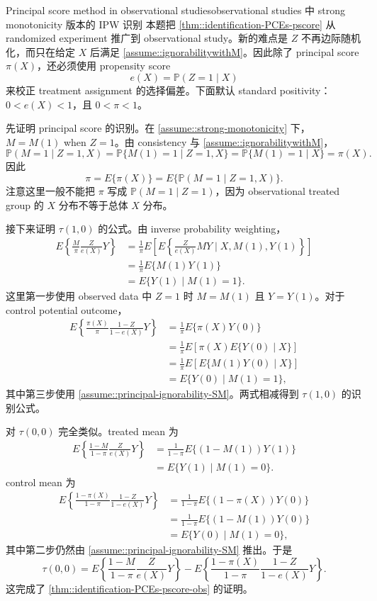 \begin{exercisesolution}{Principal score method in observational studies}{observational studies 中 strong monotonicity 版本的 IPW 识别}
本题把 \cref{thm::identification-PCEs-pscore} 从 randomized experiment 推广到 observational study。新的难点是 $Z$ 不再边际随机化，而只在给定 $X$ 后满足 \cref{assume::ignorabilitywithM}。因此除了 principal score $\pi(X)$，还必须使用 propensity score
\[
e(X)=\mathbb{P}(Z=1\mid X)
\]
来校正 treatment assignment 的选择偏差。下面默认 standard positivity：$0<e(X)<1$，且 $0<\pi<1$。

先证明 principal score 的识别。在 \cref{assume::strong-monotonicity} 下，$M=M(1)$ when $Z=1$。由 consistency 与 \cref{assume::ignorabilitywithM}，
\[
\mathbb{P}(M=1\mid Z=1,X)
=\mathbb{P}\{M(1)=1\mid Z=1,X\}
=\mathbb{P}\{M(1)=1\mid X\}
=\pi(X).
\]
因此
\[
\pi=E\{\pi(X)\}=E\{\mathbb{P}(M=1\mid Z=1,X)\}.
\]
注意这里一般不能把 $\pi$ 写成 $\mathbb{P}(M=1\mid Z=1)$，因为 observational treated group 的 $X$ 分布不等于总体 $X$ 分布。

接下来证明 $\tau(1,0)$ 的公式。由 inverse probability weighting，
\begin{align*}
E\left\{\frac{M}{\pi}\frac{Z}{e(X)}Y\right\}
&=
\frac{1}{\pi}
E\left[E\left\{\frac{Z}{e(X)}M Y\mid X,M(1),Y(1)\right\}\right]\\
&=
\frac{1}{\pi}E\{M(1)Y(1)\}\\
&=
E\{Y(1)\mid M(1)=1\}.
\end{align*}
这里第一步使用 observed data 中 $Z=1$ 时 $M=M(1)$ 且 $Y=Y(1)$。对于 control potential outcome，
\begin{align*}
E\left\{\frac{\pi(X)}{\pi}\frac{1-Z}{1-e(X)}Y\right\}
&=
\frac{1}{\pi}E\{\pi(X)Y(0)\}\\
&=
\frac{1}{\pi}E\left[\pi(X)E\{Y(0)\mid X\}\right]\\
&=
\frac{1}{\pi}E\left[E\{M(1)Y(0)\mid X\}\right]\\
&=
E\{Y(0)\mid M(1)=1\},
\end{align*}
其中第三步使用 \cref{assume::principal-ignorability-SM}。两式相减得到 $\tau(1,0)$ 的识别公式。

对 $\tau(0,0)$ 完全类似。treated mean 为
\begin{align*}
E\left\{\frac{1-M}{1-\pi}\frac{Z}{e(X)}Y\right\}
&=
\frac{1}{1-\pi}E\{(1-M(1))Y(1)\}\\
&=
E\{Y(1)\mid M(1)=0\}.
\end{align*}
control mean 为
\begin{align*}
E\left\{\frac{1-\pi(X)}{1-\pi}\frac{1-Z}{1-e(X)}Y\right\}
&=
\frac{1}{1-\pi}E\{(1-\pi(X))Y(0)\}\\
&=
\frac{1}{1-\pi}E\{(1-M(1))Y(0)\}\\
&=
E\{Y(0)\mid M(1)=0\},
\end{align*}
其中第二步仍然由 \cref{assume::principal-ignorability-SM} 推出。于是
\[
\tau(0,0)
=E\left\{\frac{1-M}{1-\pi}\frac{Z}{e(X)}Y\right\}
-E\left\{\frac{1-\pi(X)}{1-\pi}\frac{1-Z}{1-e(X)}Y\right\}.
\]
这完成了 \cref{thm::identification-PCEs-pscore-obs} 的证明。


\end{exercisesolution}
